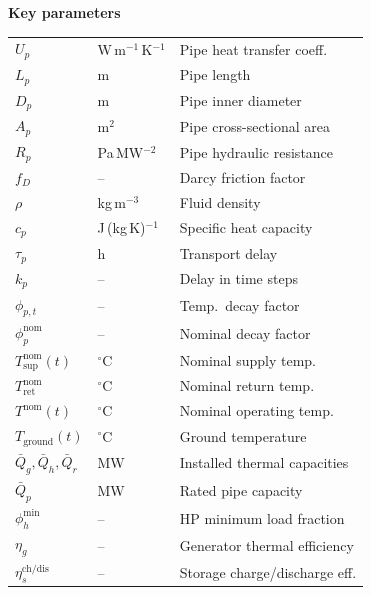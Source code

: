 \documentclass[a4paper,fleqn]{cas-dc}
\begin{document}
{\smallskip\noindent\textbf{Key parameters}\par\nopagebreak\smallskip
\noindent
\begin{tabular}{@{} >{\raggedright}p{1.5cm} >{\raggedright}p{1.8cm} p{3.2cm} @{}}
$U_p$                        & W\,m$^{-1}$\,K$^{-1}$ & Pipe heat transfer coeff. \\
$L_p$                        & m              & Pipe length \\
$D_p$                        & m              & Pipe inner diameter \\
$A_p$                        & m$^2$          & Pipe cross-sectional area \\
$R_p$                        & Pa\,MW$^{-2}$  & Pipe hydraulic resistance \\
$f_D$                        & --             & Darcy friction factor \\
$\rho$                       & kg\,m$^{-3}$   & Fluid density \\
$c_p$                        & J\,(kg\,K)$^{-1}$ & Specific heat capacity \\
$\tau_p$                     & h              & Transport delay \\
$k_p$                        & --             & Delay in time steps \\
$\phi_{p,t}$                 & --             & Temp.\ decay factor \\
$\phi_p^{\mathrm{nom}}$      & --             & Nominal decay factor \\
$T_{\mathrm{sup}}^{\mathrm{nom}}(t)$ & $^\circ$C & Nominal supply temp. \\
$T_{\mathrm{ret}}^{\mathrm{nom}}$    & $^\circ$C & Nominal return temp. \\
$T^{\mathrm{nom}}(t)$        & $^\circ$C      & Nominal operating temp. \\
$T_{\mathrm{ground}}(t)$     & $^\circ$C      & Ground temperature \\
$\bar{Q}_g,\bar{Q}_h,\bar{Q}_r$ & MW         & Installed thermal capacities \\
$\bar{Q}_p$                  & MW             & Rated pipe capacity \\
$\phi_h^{\mathrm{min}}$      & --             & HP minimum load fraction \\
$\eta_g$                     & --             & Generator thermal efficiency \\
$\eta_s^{\mathrm{ch/dis}}$   & --             & Storage charge/discharge eff. \\

\end{tabular}}
\end{document}
